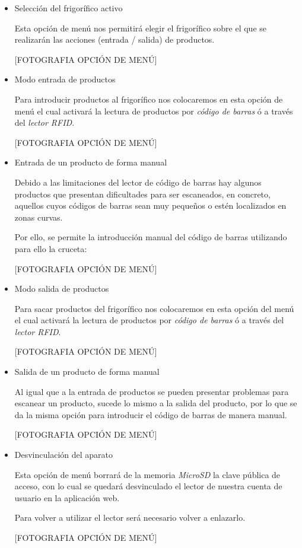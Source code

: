 \begin{itemize}

    \item Selección del frigorífico activo

        Esta opción de menú nos permitirá elegir el frigorífico sobre el que se realizarán las acciones (entrada / salida) de productos.

        [FOTOGRAFIA OPCIÓN DE MENÚ]

    \item Modo entrada de productos

        Para introducir productos al frigorífico nos colocaremos en esta opción de menú el cual activará la lectura de productos por \emph{código de barras} ó a través del \emph{lector RFID}.

        [FOTOGRAFIA OPCIÓN DE MENÚ]

    \item Entrada de un producto de forma manual

        Debido a las limitaciones del lector de código de barras hay algunos productos que presentan dificultades para ser escaneados, en concreto, aquellos cuyos códigos de barras sean muy pequeños o estén localizados en zonas curvas.

        Por ello, se permite la introducción manual del código de barras utilizando para ello la cruceta:

        [FOTOGRAFIA OPCIÓN DE MENÚ]

    \item Modo salida de productos

        Para sacar productos del frigorífico nos colocaremos en esta opción del menú el cual activará la lectura de productos por \emph{código de barras} ó a través del \emph{lector RFID}.

        [FOTOGRAFIA OPCIÓN DE MENÚ]

    \item Salida de un producto de forma manual

        Al igual que a la entrada de productos se pueden presentar problemas para escanear un producto, sucede lo mismo a la salida del producto, por lo que se da la misma opción para introducir el código de barras de manera manual.

        [FOTOGRAFIA OPCIÓN DE MENÚ]

    \item Desvinculación del aparato

        Esta opción de menú borrará de la memoria \emph{MicroSD} la clave pública de acceso, con lo cual se quedará desvinculado el lector de nuestra cuenta de usuario en la aplicación web.

        Para volver a utilizar el lector será necesario volver a enlazarlo.

        [FOTOGRAFIA OPCIÓN DE MENÚ]

\end{itemize}